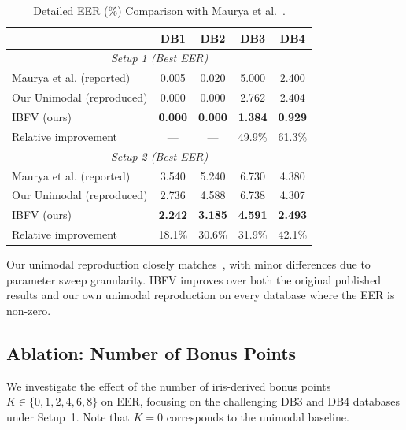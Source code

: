 \documentclass[conference]{IEEEtran}
\newcommand{\IBFV}{\textsf{IBFV}}
\begin{document}
\begin{table}[t]
\centering
\caption{Detailed EER (\%) Comparison with Maurya et al.~\cite{maurya2025enhancing}.}
\label{tab:comparison}
\begin{tabular}{@{}l c c c c@{}}
\toprule
 & \textbf{DB1} & \textbf{DB2} & \textbf{DB3} & \textbf{DB4} \\
\midrule
\multicolumn{5}{c}{\textit{Setup 1 (Best EER)}} \\
\midrule
Maurya et al. (reported) & 0.005 & 0.020 & 5.000 & 2.400 \\
Our Unimodal (reproduced) & 0.000 & 0.000 & 2.762 & 2.404 \\
\IBFV{} (ours)            & \textbf{0.000} & \textbf{0.000} & \textbf{1.384} & \textbf{0.929} \\
Relative improvement      & --- & --- & 49.9\% & 61.3\% \\
\midrule
\multicolumn{5}{c}{\textit{Setup 2 (Best EER)}} \\
\midrule
Maurya et al. (reported) & 3.540 & 5.240 & 6.730 & 4.380 \\
Our Unimodal (reproduced) & 2.736 & 4.588 & 6.738 & 4.307 \\
\IBFV{} (ours)            & \textbf{2.242} & \textbf{3.185} & \textbf{4.591} & \textbf{2.493} \\
Relative improvement      & 18.1\% & 30.6\% & 31.9\% & 42.1\% \\
\bottomrule
\end{tabular}
\end{table}

Our unimodal reproduction closely matches~\cite{maurya2025enhancing}, with minor differences due to parameter sweep granularity. \IBFV{} improves over both the original published results and our own unimodal reproduction on every database where the EER is non-zero.

\subsection{Ablation: Number of Bonus Points}
\label{sec:ablation}

We investigate the effect of the number of iris-derived bonus points $K \in \{0, 1, 2, 4, 6, 8\}$ on EER, focusing on the challenging DB3 and DB4 databases under Setup~1. Note that $K = 0$ corresponds to the unimodal baseline.
\end{document}

